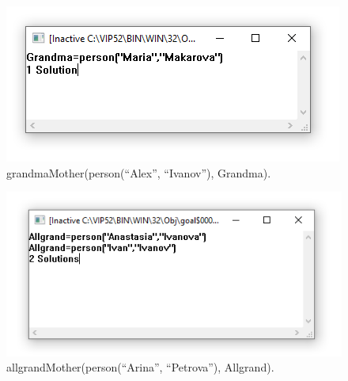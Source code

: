 \begin{figure}[H]
    \centering
    \includegraphics[scale=0.8]{img/4.png}
    \caption{grandmaMother(person(``Alex'', ``Ivanov''), Grandma).}
\end{figure}

\begin{figure}[H]
    \centering
    \includegraphics[scale=0.8]{img/5.png}
    \caption{allgrandMother(person(``Arina'', ``Petrova''), Allgrand).}
\end{figure}

